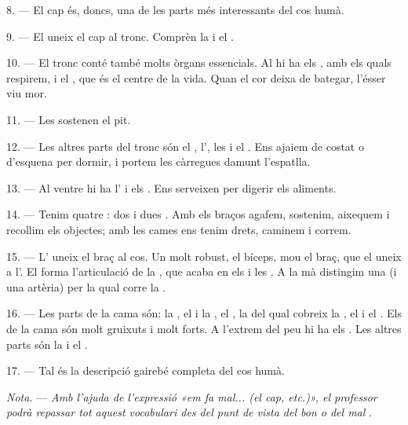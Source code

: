 8. --- El cap és, doncs, una de les parts més interessants del cos humà.

\VUsaut{4.4mm}
\VUsaut{3.0mm}

9. --- El  uneix el cap al tronc. Comprèn la  i el
.

10. --- El tronc conté també molts òrgans essencials. Al  hi ha els
, amb els quals respirem, i el , que és el centre de
la vida. Quan el cor deixa de bategar, l'ésser viu mor.

11. --- Les  sostenen el pit.

12. --- Les altres parts del tronc són el , l', les
 i el . Ens ajaiem de costat o d'esquena per dormir, i portem
les càrregues damunt l'espatlla.

13. --- Al ventre hi ha l' i els . Ens serveixen per digerir
els aliments.

\VUsaut{4.4mm}
\VUsaut{3.0mm}

14. --- Tenim quatre : dos  i dues
. Amb els braços agafem, sostenim, aixequem i recollim els
objectes; amb les cames ens tenim drets, caminem i correm.

15. --- L' uneix el braç al cos. Un  molt robust, el bíceps,
mou el braç, que el  uneix a l'. El  forma
l'articulació de la , que acaba en els
 i les . A la mà distingim una  (i una
artèria) per la qual corre la .

16. --- Les parts de la cama són: la , el  i la
, el , la  del qual cobreix la
, el  i el . Els  de la
cama són molt gruixuts i molt forts. A l'extrem del peu hi ha els . Les
altres parts són la  i el .

17. --- Tal és la descripció gairebé completa del cos humà.

\textit{Nota.} --- \textit{Amb l'ajuda de l'expressió «em fa mal... (el cap, etc.)», el
professor podrà repassar tot aquest vocabulari des del punt de vista del bon o del mal}
.

